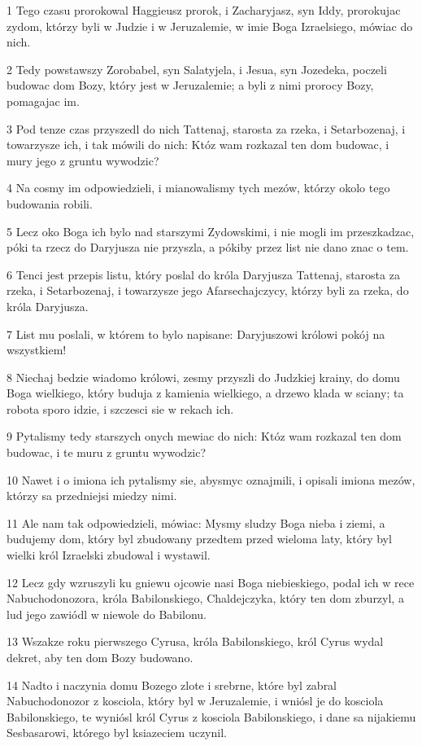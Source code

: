 \par 1 Tego czasu prorokowal Haggieusz prorok, i Zacharyjasz, syn Iddy, prorokujac zydom, którzy byli w Judzie i w Jeruzalemie, w imie Boga Izraelsiego, mówiac do nich.
\par 2 Tedy powstawszy Zorobabel, syn Salatyjela, i Jesua, syn Jozedeka, poczeli budowac dom Bozy, który jest w Jeruzalemie; a byli z nimi prorocy Bozy, pomagajac im.
\par 3 Pod tenze czas przyszedl do nich Tattenaj, starosta za rzeka, i Setarbozenaj, i towarzysze ich, i tak mówili do nich: Któz wam rozkazal ten dom budowac, i mury jego z gruntu wywodzic?
\par 4 Na cosmy im odpowiedzieli, i mianowalismy tych mezów, którzy okolo tego budowania robili.
\par 5 Lecz oko Boga ich bylo nad starszymi Zydowskimi, i nie mogli im przeszkadzac, póki ta rzecz do Daryjusza nie przyszla, a pókiby przez list nie dano znac o tem.
\par 6 Tenci jest przepis listu, który poslal do króla Daryjusza Tattenaj, starosta za rzeka, i Setarbozenaj, i towarzysze jego Afarsechajczycy, którzy byli za rzeka, do króla Daryjusza.
\par 7 List mu poslali, w którem to bylo napisane: Daryjuszowi królowi pokój na wszystkiem!
\par 8 Niechaj bedzie wiadomo królowi, zesmy przyszli do Judzkiej krainy, do domu Boga wielkiego, który buduja z kamienia wielkiego, a drzewo klada w sciany; ta robota sporo idzie, i szczesci sie w rekach ich.
\par 9 Pytalismy tedy starszych onych mewiac do nich: Któz wam rozkazal ten dom budowac, i te muru z gruntu wywodzic?
\par 10 Nawet i o imiona ich pytalismy sie, abysmyc oznajmili, i opisali imiona mezów, którzy sa przedniejsi miedzy nimi.
\par 11 Ale nam tak odpowiedzieli, mówiac: Mysmy sludzy Boga nieba i ziemi, a budujemy dom, który byl zbudowany przedtem przed wieloma laty, który byl wielki król Izraelski zbudowal i wystawil.
\par 12 Lecz gdy wzruszyli ku gniewu ojcowie nasi Boga niebieskiego, podal ich w rece Nabuchodonozora, króla Babilonskiego, Chaldejczyka, który ten dom zburzyl, a lud jego zawiódl w niewole do Babilonu.
\par 13 Wszakze roku pierwszego Cyrusa, króla Babilonskiego, król Cyrus wydal dekret, aby ten dom Bozy budowano.
\par 14 Nadto i naczynia domu Bozego zlote i srebrne, które byl zabral Nabuchodonozor z kosciola, który byl w Jeruzalemie, i wniósl je do kosciola Babilonskiego, te wyniósl król Cyrus z kosciola Babilonskiego, i dane sa nijakiemu Sesbasarowi, którego byl ksiazeciem uczynil.
